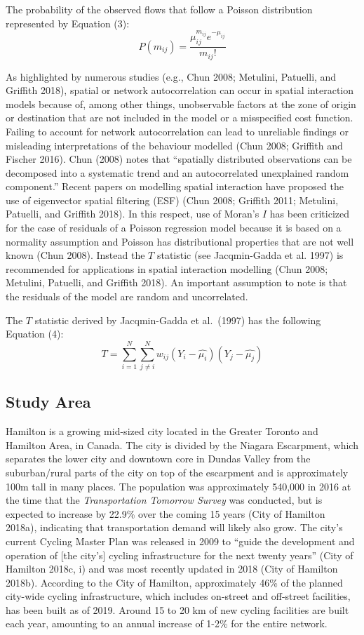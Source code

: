 \documentclass[smallextended]{svjour3}       %
\begin{document}
The probability of the observed flows that follow a Poisson distribution
represented by Equation (3): \[
P(m_{ij}) = \frac{\mu_{ij}^{m_{ij}}e^{-\mu_{ij}}}{m_{ij}!}
\]

As highlighted by numerous studies (e.g., Chun 2008; Metulini, Patuelli,
and Griffith 2018), spatial or network autocorrelation can occur in
spatial interaction models because of, among other things, unobservable
factors at the zone of origin or destination that are not included in
the model or a misspecified cost function. Failing to account for
network autocorrelation can lead to unreliable findings or misleading
interpretations of the behaviour modelled (Chun 2008; Griffith and
Fischer 2016). Chun (2008) notes that ``spatially distributed
observations can be decomposed into a systematic trend and an
autocorrelated unexplained random component.'' Recent papers on
modelling spatial interaction have proposed the use of eigenvector
spatial filtering (ESF) (Chun 2008; Griffith 2011; Metulini, Patuelli,
and Griffith 2018). In this respect, use of Moran's \(I\) has been
criticized for the case of residuals of a Poisson regression model
because it is based on a normality assumption and Poisson has
distributional properties that are not well known (Chun 2008). Instead
the \(T\) statistic (see Jacqmin-Gadda et al. 1997) is recommended for
applications in spatial interaction modelling (Chun 2008; Metulini,
Patuelli, and Griffith 2018). An important assumption to note is that
the residuals of the model are random and uncorrelated.

The \(T\) statistic derived by Jacqmin-Gadda et al.~(1997) has the
following Equation (4): \[
T = \sum_{i=1}^{N} \sum_{j\ne{i}}^{N} w_{ij}(Y_i - \hat{\mu_i})(Y_j - \hat{\mu_j})
\]

\hypertarget{study-area}{%
\subsection{Study Area}\label{study-area}}

Hamilton is a growing mid-sized city located in the Greater Toronto and
Hamilton Area, in Canada. The city is divided by the Niagara Escarpment,
which separates the lower city and downtown core in Dundas Valley from
the suburban/rural parts of the city on top of the escarpment and is
approximately 100m tall in many places. The population was approximately
540,000 in 2016 at the time that the \emph{Transportation Tomorrow
Survey} was conducted, but is expected to increase by 22.9\% over the
coming 15 years (City of Hamilton 2018a), indicating that transportation
demand will likely also grow. The city's current Cycling Master Plan was
released in 2009 to ``guide the development and operation of {[}the
city's{]} cycling infrastructure for the next twenty years'' (City of
Hamilton 2018c, i) and was most recently updated in 2018 (City of
Hamilton 2018b). According to the City of Hamilton, approximately 46\%
of the planned city-wide cycling infrastructure, which includes
on-street and off-street facilities, has been built as of 2019. Around
15 to 20 km of new cycling facilities are built each year, amounting to
an annual increase of 1-2\% for the entire network.
\end{document}
